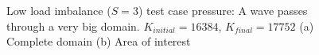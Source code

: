 \begin{figure}[H]
    \centering
    \hfill
    \caption{Low load imbalance (\(S = 3\)) test case pressure: A wave passes through a very big domain. \(K_{initial} = 16384\), \(K_{final} = 17752\) (a) Complete domain (b) Area of interest}\label{fig:load_imbalance_case_low_p}
\end{figure}

